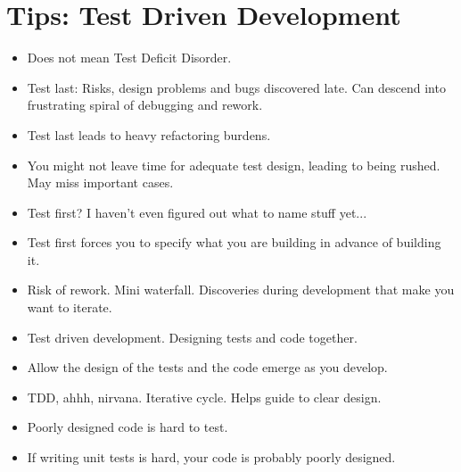 \documentclass{article}
\begin{document}
\sloppy
\section{Tips: Test Driven Development}
\begin{itemize}
    \item Does not mean Test Deficit Disorder.
    \item Test last: Risks, design problems and bugs discovered late. Can
        descend into frustrating spiral of debugging and rework.
    \item Test last leads to heavy refactoring burdens.
    \item You might not leave time for adequate test design, leading to being
        rushed. May miss important cases.
    \item Test first? I haven't even figured out what to name stuff yet...
    \item Test first forces you to specify what you are building in advance
        of building it.
    \item Risk of rework. Mini waterfall. Discoveries during development that
        make you want to iterate.
    \item Test driven development. Designing tests and code together.
    \item Allow the design of the tests and the code emerge as you develop.
    \item TDD, ahhh, nirvana. Iterative cycle. Helps guide to clear design.
    \item Poorly designed code is hard to test.
    \item If writing unit tests is hard, your code is probably poorly designed.
\end{itemize}
\end{document}

